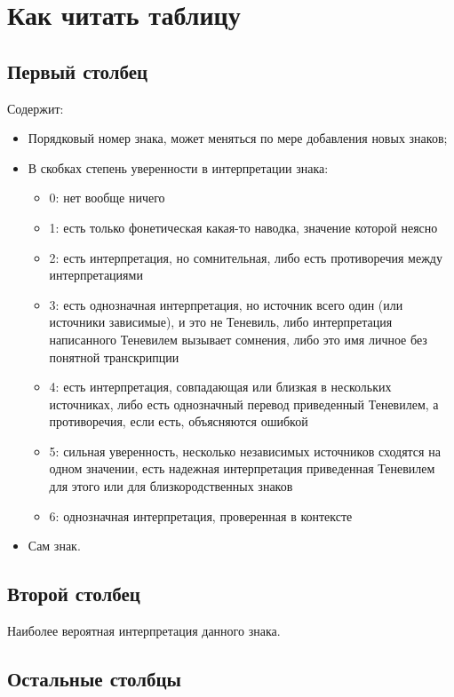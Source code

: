 \documentclass{article}
\begin{document}
\section{Как читать таблицу} 

\subsection{Первый столбец}
Содержит: 

\begin{itemize}
\item Порядковый номер знака, может меняться по мере добавления новых знаков; 
\item В скобках степень уверенности в интерпретации знака:
	\begin{itemize}
		\item 0:	нет вообще ничего
		\item 1: 	есть только фонетическая какая-то наводка, значение которой неясно
		\item 2:	есть интерпретация, но сомнительная, либо есть противоречия между интерпретациями
		\item 3:	есть однозначная интерпретация, но источник всего один (или источники зависимые), и это не Теневиль, либо интерпретация написанного Теневилем вызывает сомнения, либо это имя личное без понятной транскрипции
		\item 4:	есть интерпретация, совпадающая или близкая в нескольких источниках,  либо есть однозначный перевод приведенный Теневилем, а противоречия, если есть, объясняются ошибкой
		\item 5:	сильная уверенность, несколько независимых источников сходятся на одном значении, есть надежная интерпретация приведенная Теневилем для этого или для близкородственных знаков 
		\item 6:	однозначная интерпретация, проверенная в контексте %
	\end{itemize}
\item Сам знак.
\end{itemize}

\subsection{Второй столбец}
Наиболее вероятная интерпретация данного знака.

\subsection{Остальные столбцы}
\end{document}
